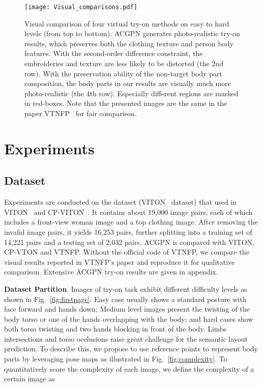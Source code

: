 \documentclass[10pt,twocolumn,letterpaper]{article}
\begin{document}
\begin{figure*}[t]
\begin{center}
\texttt{[image: Visual\_comparisons.pdf]}
\vspace{-10pt}
\end{center}
   \caption{\footnotesize Visual comparison of four virtual try-on methods on easy to hard levels (from top to bottom). ACGPN generates photo-realistic try-on results, which preserves both
the clothing texture and person body features. With the second-order difference constraint, the embroideries and texture are less likely to be distorted (\ie the 2nd row). With the preservation ability of the non-target body part composition, the body parts in our results are visually much more photo-realistic (\ie the 4th row). Especially different regions are marked in red-boxes. Note that the presented images are the same in the paper VTNFP~\cite{Yu_2019_ICCV} for fair comparison.}
\label{fig:Comparison}
\vspace{-10pt}
\end{figure*}







\section{Experiments}




\subsection{Dataset}
Experiments are conducted on the dataset (\ie VITON~\cite{DBLP:conf/cvpr/HanWWYD18} dataset) that used in VITON~\cite{DBLP:conf/cvpr/HanWWYD18} and CP-VITON~\cite{DBLP:conf/eccv/WangZLCLY18}. It contains about 19,000 image pairs, each of which includes a front-view woman image and a top clothing  image. After removing the invalid image pairs, it yields 16,253 pairs, further splitting into a training set of 14,221 pairs and a testing set of 2,032 pairs. ACGPN is compared with VITON, CP-VTON and VTNFP. Without the official code of VTNFP, we compare the visual results reported in VTNFP's paper and reproduce it for qualitative comparison. Extensive ACGPN try-on results are given in appendix.




\textbf{Dataset Partition}.
Images of try-on task exhibit different difficulty levels as shown in Fig.~\ref{fig:firstpage}. Easy case usually shows a standard posture with face forward and hands down; Medium level images present the twisting of the body torso or one of the hands overlapping with the body; and hard cases show both torso twisting and two hands blocking in front of the body. Limbs intersections and torso occlusions raise great challenge for the semantic layout prediction. To describe this, we propose to use reference points to represent body parts by leveraging pose maps as illustrated in Fig.~\ref{fig:complexity}. To quantitatively score the complexity of each image, we define the complexity of a certain image as
\vspace{-5pt}
\end{document}
